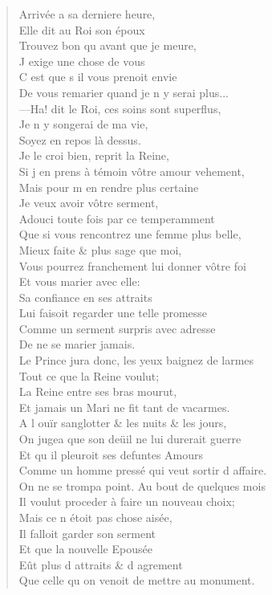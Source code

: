 \begin{verse}
\vin Arrivée a sa derniere heure, \\
\vin Elle dit au Roi son époux \\
\vin Trouvez bon qu\textquotesingle{} avant que je meure, \\
\vin J\textquotesingle{} exige une chose de vous \\
\vin C\textquotesingle{} est que s\textquotesingle{} il vous prenoit envie \\
De vous remarier quand je n\textquotesingle{} y serai plus... \\
\vin —Ha! dit le Roi, ces soins sont superflus, \\
\vin Je n\textquotesingle{} y songerai de ma vie, \\
\vin Soyez en repos là dessus. \\
\vin Je le croi bien, reprit la Reine, \\
Si j\textquotesingle{} en prens à témoin vôtre amour vehement, \\
\vin Mais pour m\textquotesingle{} en rendre plus certaine \\
\vin Je veux avoir vôtre serment, \\
Adouci toute fois par ce temperamment \\
Que si vous rencontrez une femme plus belle, \\
\vin Mieux faite \& plus sage que moi, \\
Vous pourrez franchement lui donner vôtre foi \\
\vin Et vous marier avec elle: \\
\vin Sa confiance en ses attraits \\
Lui faisoit regarder une telle promesse \\
\vin Comme un serment surpris avec adresse \\
\vin De ne se marier jamais. \\
Le Prince jura donc, les yeux baignez de larmes \\
\vin Tout ce que la Reine voulut; \\
\vin La Reine entre ses bras mourut, \\
Et jamais un Mari ne fit tant de vacarmes. \\
A l\textquotesingle{} ouïr sanglotter \& les nuits \& les jours, \\
On jugea que son deüil ne lui durerait guerre \\
\vin Et qu\textquotesingle{} il pleuroit ses defuntes Amours \\
Comme un homme pressé qui veut sortir d\textquotesingle{} affaire. \\
On ne se trompa point. Au bout de quelques mois \\
Il voulut proceder à faire un nouveau choix; \\
\vin Mais ce n\textquotesingle{} étoit pas chose aisée, \\
\vin Il falloit garder son serment \\
\vin Et que la nouvelle Epousée \\
\vin Eût plus d\textquotesingle{} attraits \& d\textquotesingle{} agrement \\
Que celle qu\textquotesingle{} on venoit de mettre au monument.


\end{verse}
